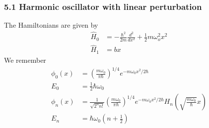 \documentclass[10pt,a4paper]{book}
\theoremstyle{definition}
\begin{document}
\subsubsection{5.1 Harmonic oscillator with linear perturbation}
The Hamiltonians are given by
\begin{align}
\hat{H}_0&=-\frac{\hbar^2}{2m}\frac{d^2}{dx^2}+\frac{1}{2}m\omega_o^2x^2\\
\hat{H}_1&=bx
\end{align}
We remember
\begin{align}
\phi_0(x)&=\left(\frac{m\omega_0}{\pi\hbar}\right)^{1/4}e^{-m\omega_0x^2/2\hbar}\\
E_0&=\frac{1}{2}\hbar\omega_0\\
\phi_n(x)&=\frac{1}{\sqrt{2^n n!}}\left(\frac{m\omega_0}{\pi\hbar}\right)^{1/4}e^{-m\omega_0x^2/2\hbar}H_n\left(\sqrt{\frac{m\omega_0}{\hbar}}x\right)\\
E_n&=\hbar\omega_0\left(n+\frac{1}{2}\right)
\end{align}
\end{document}
